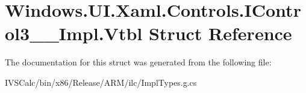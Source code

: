 \hypertarget{struct_windows_1_1_u_i_1_1_xaml_1_1_controls_1_1_i_control3_____impl_1_1_vtbl}{}\section{Windows.\+U\+I.\+Xaml.\+Controls.\+I\+Control3\+\_\+\+\_\+\+Impl.\+Vtbl Struct Reference}
\label{struct_windows_1_1_u_i_1_1_xaml_1_1_controls_1_1_i_control3_____impl_1_1_vtbl}


The documentation for this struct was generated from the following file\+:\begin{DoxyCompactItemize}
\item 
I\+V\+S\+Calc/bin/x86/\+Release/\+A\+R\+M/ilc/Impl\+Types.\+g.\+cs\end{DoxyCompactItemize}
